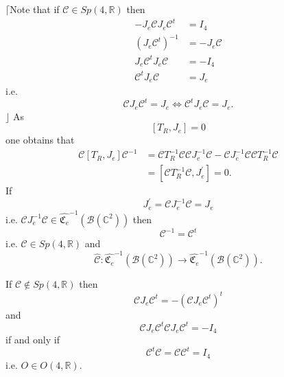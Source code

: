 \documentclass[aps,preprint]{revtex4}%
\begin{document}
$\lceil$Note that if $\mathcal{C\in}Sp\left(  4,\mathbb{R}\right)  $ then
\begin{align}
-J_{e}\mathcal{C}J_{e}\mathcal{C}^{t}  &  =I_{4}\\
\left(  J_{e}\mathcal{C}^{t}\right)  ^{-1}  &  =-J_{e}\mathcal{C}\\
J_{e}\mathcal{C}^{t}J_{e}\mathcal{C}  &  =\mathcal{-}I_{4}\\
\mathcal{C}^{t}J_{e}\mathcal{C}  &  =J_{e}%
\end{align}
i.e.
\begin{equation}
\mathcal{C}J_{e}\mathcal{C}^{t}=J_{e}\Longleftrightarrow\mathcal{C}^{t}%
J_{e}\mathcal{C}=J_{e}.
\end{equation}
$\rfloor$ As
\begin{equation}
\left[  T_{R},J_{e}\right]  =0
\end{equation}
one obtains that
\begin{align}
\mathcal{C}\left[  T_{R},J_{e}\right]  \mathcal{C}^{-1}  &  =\mathcal{C}%
T_{R}^{-1}\mathcal{CC}J_{e}^{-1}\mathcal{C}-\mathcal{C}J_{e}^{-1}%
\mathcal{CC}T_{R}^{-1}\mathcal{C}\\
&  =\left[  \mathcal{C}T_{R}^{-1}\mathcal{C},J_{e}^{\prime}\right]  =0.
\end{align}
If
\begin{equation}
J_{e}^{\prime}=\mathcal{C}J_{e}^{-1}\mathcal{C}=J_{e}%
\end{equation}
i.e. $\mathcal{C}J_{e}^{-1}\mathcal{C}\in\widehat{\mathfrak{C}_{e}}%
^{-1}\left(  \mathcal{B}\left(  \mathbb{C}^{2}\right)  \right)  $ then
\begin{equation}
\mathcal{C}^{-1}=\mathcal{C}^{t}%
\end{equation}
i.e. $\mathcal{C}\in Sp\left(  4,\mathbb{R}\right)  $ and
\begin{equation}
\widehat{\mathcal{C}}:\widehat{\mathfrak{C}_{e}}^{-1}\left(  \mathcal{B}%
\left(  \mathbb{C}^{2}\right)  \right)  \rightarrow\widehat{\mathfrak{C}_{e}%
}^{-1}\left(  \mathcal{B}\left(  \mathbb{C}^{2}\right)  \right)  .
\end{equation}


If $\mathcal{C}\notin Sp\left(  4,\mathbb{R}\right)  $ then
\begin{equation}
\mathcal{C}J_{e}\mathcal{C}^{t}=-\left(  \mathcal{C}J_{e}\mathcal{C}%
^{t}\right)  ^{t}%
\end{equation}
and
\begin{equation}
\mathcal{C}J_{e}\mathcal{C}^{t}\mathcal{C}J_{e}\mathcal{C}^{t}=-I_{4}%
\end{equation}
if and only if
\begin{equation}
\mathcal{C}^{t}\mathcal{C}=\mathcal{CC}^{t}=I_{4}%
\end{equation}
i.e. $O\in O\left(  4,\mathbb{R}\right)  .$
\end{document}

